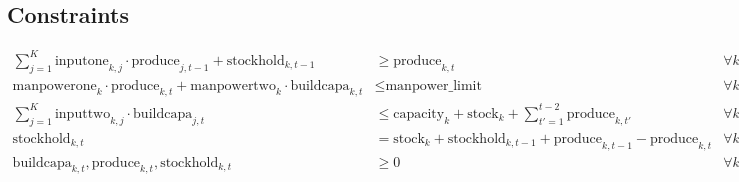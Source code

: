 \documentclass{article}
\begin{document}
\subsection*{Constraints}
\begin{align*}
\sum_{j=1}^{K} \text{inputone}_{k, j} \cdot \text{produce}_{j, t-1} + \text{stockhold}_{k, t-1} & \geq \text{produce}_{k, t} & \forall k, \forall t \\
\text{manpowerone}_{k} \cdot \text{produce}_{k, t} + \text{manpowertwo}_{k} \cdot \text{buildcapa}_{k, t} & \leq \text{manpower\_limit} & \forall k, \forall t \\
\sum_{j=1}^{K} \text{inputtwo}_{k, j} \cdot \text{buildcapa}_{j, t} & \leq \text{capacity}_{k} + \text{stock}_{k} + \sum_{t'=1}^{t-2} \text{produce}_{k, t'} & \forall k, \forall t \\
\text{stockhold}_{k, t} & = \text{stock}_{k} + \text{stockhold}_{k, t-1} + \text{produce}_{k, t-1} - \text{produce}_{k, t} & \forall k, \forall t \\
\text{buildcapa}_{k, t}, \text{produce}_{k, t}, \text{stockhold}_{k, t} & \geq 0 & \forall k, \forall t
\end{align*}
\end{document}
